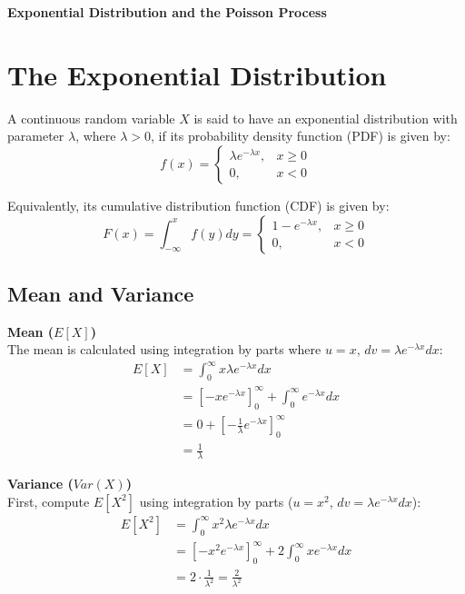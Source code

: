 \begin{center}
    \Large\textbf{\textcolor{primary}{Exponential Distribution and the Poisson Process}}
\end{center}
\vspace{0.5cm}

\section{\textcolor{secondary}{The Exponential Distribution}}
A continuous random variable $X$ is said to have an exponential distribution with parameter $\lambda$, where $\lambda > 0$, if its probability density function (PDF) is given by:
\[ f(x) = \begin{cases} \lambda e^{-\lambda x}, & x \ge 0 \\ 0, & x < 0 \end{cases} \]

Equivalently, its cumulative distribution function (CDF) is given by:
\[ F(x) = \int_{-\infty}^{x} f(y)dy = \begin{cases} 1 - e^{-\lambda x}, & x \ge 0 \\ 0, & x < 0 \end{cases} \]

\subsection{\textcolor{secondary}{Mean and Variance}}
\textbf{\textcolor{primary}{Mean ($E[X]$)}}\\
The mean is calculated using integration by parts where $u = x$, $dv = \lambda e^{-\lambda x}dx$:
\begin{align*}
E[X] &= \int_{0}^{\infty} x \lambda e^{-\lambda x} dx \\
&= \left[ -xe^{-\lambda x} \right]_{0}^{\infty} + \int_{0}^{\infty} e^{-\lambda x} dx \\
&= 0 + \left[ -\frac{1}{\lambda} e^{-\lambda x} \right]_{0}^{\infty} \\
&= \frac{1}{\lambda}
\end{align*}

\textbf{\textcolor{primary}{Variance ($Var(X)$)}}\\
First, compute $E[X^2]$ using integration by parts ($u = x^2$, $dv = \lambda e^{-\lambda x}dx$):
\begin{align*}
E[X^2] &= \int_{0}^{\infty} x^2 \lambda e^{-\lambda x} dx \\
&= \left[ -x^2 e^{-\lambda x} \right]_{0}^{\infty} + 2\int_{0}^{\infty} x e^{-\lambda x} dx \\
&= 2 \cdot \frac{1}{\lambda^2} = \frac{2}{\lambda^2}
\end{align*}

